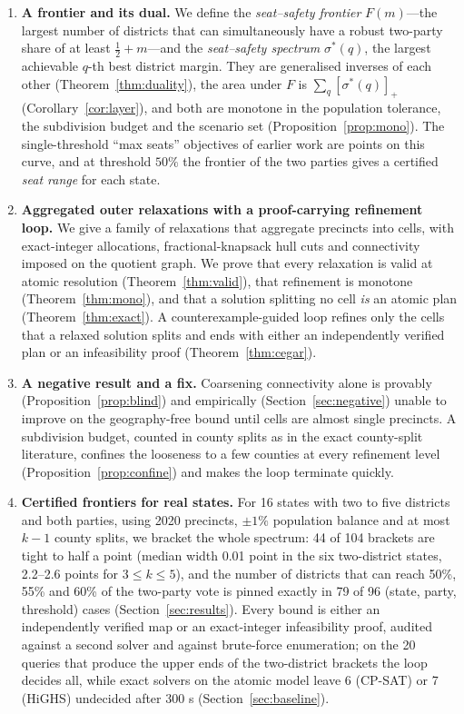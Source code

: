 \begin{enumerate}[leftmargin=*]
\item \textbf{A frontier and its dual.} We define the \emph{seat--safety frontier} $F(m)$---the largest number of districts that can simultaneously have a robust two-party share of at least $\tfrac12+m$---and the \emph{seat--safety spectrum} $\sigma^*(q)$, the largest achievable $q$-th best district margin. They are generalised inverses of each other (Theorem~\ref{thm:duality}), the area under $F$ is $\sum_q[\sigma^*(q)]_+$ (Corollary~\ref{cor:layer}), and both are monotone in the population tolerance, the subdivision budget and the scenario set (Proposition~\ref{prop:mono}). The single-threshold ``max seats'' objectives of earlier work are points on this curve, and at threshold $50\%$ the frontier of the two parties gives a certified \emph{seat range} for each state.
\item \textbf{Aggregated outer relaxations with a proof-carrying refinement loop.} We give a family of relaxations that aggregate precincts into cells, with exact-integer allocations, fractional-knapsack hull cuts and connectivity imposed on the quotient graph. We prove that every relaxation is valid at atomic resolution (Theorem~\ref{thm:valid}), that refinement is monotone (Theorem~\ref{thm:mono}), and that a solution splitting no cell \emph{is} an atomic plan (Theorem~\ref{thm:exact}). A counterexample-guided loop refines only the cells that a relaxed solution splits and ends with either an independently verified plan or an infeasibility proof (Theorem~\ref{thm:cegar}).
\item \textbf{A negative result and a fix.} Coarsening connectivity alone is provably (Proposition~\ref{prop:blind}) and empirically (Section~\ref{sec:negative}) unable to improve on the geography-free bound until cells are almost single precincts. A subdivision budget, counted in county splits as in the exact county-split literature, confines the looseness to a few counties at every refinement level (Proposition~\ref{prop:confine}) and makes the loop terminate quickly.
\item \textbf{Certified frontiers for real states.} For 16 states with two to five districts and both parties, using 2020 precincts, $\pm1\%$ population balance and at most $k-1$ county splits, we bracket the whole spectrum: 44 of 104 brackets are tight to half a point (median width 0.01 point in the six two-district states, 2.2--2.6 points for $3\le k\le5$), and the number of districts that can reach 50\%, 55\% and 60\% of the two-party vote is pinned exactly in 79 of 96 (state, party, threshold) cases (Section~\ref{sec:results}). Every bound is either an independently verified map or an exact-integer infeasibility proof, audited against a second solver and against brute-force enumeration; on the 20 queries that produce the upper ends of the two-district brackets the loop decides all, while exact solvers on the atomic model leave 6 (CP-SAT) or 7 (HiGHS) undecided after 300 s (Section~\ref{sec:baseline}).

\end{enumerate}
